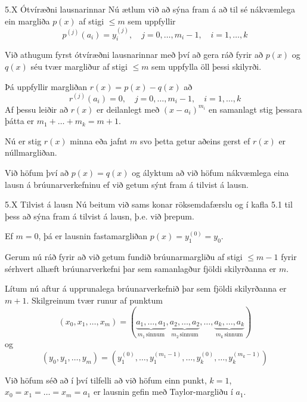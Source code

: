 \begin{frame}{5.X Ótvíræðni lausnarinnar} 
Nú ætlum við að sýna fram á að til sé nákvæmlega ein margliða 
$p(x)$ af stigi $\leq m$ sem uppfyllir 
\begin{equation*}
  p^{(j)}(a_i) = y_i^{(j)}, 
  \quad j = 0, \ldots, m_i-1, \quad i = 1, \ldots, k
\end{equation*}

\pause
Við athugum fyrst ótvíræðni lausnarinnar með því að gera ráð fyrir 
að $p(x)$ og $q(x)$ séu tvær margliður af stigi $\leq m$ sem 
uppfylla öll þessi skilyrði.

\pause
Þá uppfyllir margliðan $r(x) = p(x) - q(x)$ að
\begin{equation*}
  r^{(j)}(a_i) = 0, \quad j = 0, \ldots, m_i-1,
  \quad i = 1, \ldots,k
\end{equation*}
\pause
Af þessu leiðir að $r(x)$ er deilanlegt með $(x-a_i)^{m_i}$ en 
samanlagt stig þessara þátta er $m_1 + \ldots + m_k = m + 1$. 

\pause
Nú er stig $r(x)$ minna eða jafnt $m$ svo þetta getur aðeins gerst 
ef $r(x)$ er núllmargliðan. 

\pause
Við höfum því að $p(x) = q(x)$ og ályktum að við höfum nákvæmlega 
eina lausn á brúunarverkefninu  ef við getum 
sýnt fram á tilvist á lausn.
\end{frame}

\begin{frame}{5.X Tilvist á lausn} 
Nú beitum við sams konar röksemdafærslu og í kafla 5.1 
til þess að sýna fram á tilvist á lausn, þ.e. við þrepum.

\pause
Ef $m = 0$, þá er lausnin fastamargliðan $p(x) = y_1^{(0)}=y_0$.

\pause
\smallskip
Gerum nú ráð fyrir 
að við getum fundið brúunarmargliðu af stigi $\leq m-1$ fyrir 
sérhvert alhæft brúunarverkefni þar 
sem samanlagður fjöldi skilyrðanna er $m$.

\pause
\smallskip
Lítum nú aftur á upprunalega brúunarverkefnið þar sem fjöldi
skilyrðanna er $m+1$.   Skilgreinum tvær runur af punktum
\begin{equation*}
  (x_0,x_1,\ldots,x_m) = 
  (\underbrace{a_1, \ldots, a_1}_{m_1 \, \text{sinnum}}, 
  \underbrace{a_2, \ldots , a_2}_{m_2 \, \text{sinnum}}, 
  \ldots , 
  \underbrace{a_k, \ldots , a_k}_{m_k \, \text{sinnum}}) 
\end{equation*}
og
\begin{equation*}
  (y_0,y_1,\ldots,y_m) = 
  (y_1^{(0)}, \ldots, y_1^{(m_1-1)}, \ldots,
  y_k^{(0)}, \ldots, y_k^{(m_k-1)})
\end{equation*}

\pause
\smallskip
Við höfum séð að í því tilfelli að við höfum einn punkt, $k=1$,  
$x_0 = x_1 = \ldots = x_m = a_1$  er lausnin gefin 
með Taylor-margliðu í $a_1$. 
\end{frame}

